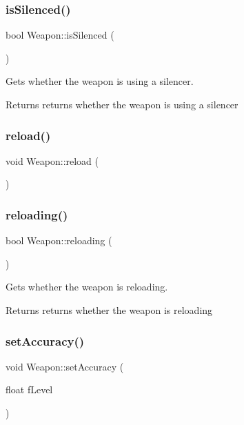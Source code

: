 \subsubsection{\texorpdfstring{is\+Silenced()}{isSilenced()}}
{\footnotesize\ttfamily bool Weapon\+::is\+Silenced (\begin{DoxyParamCaption}{ }\end{DoxyParamCaption})}



Gets whether the weapon is using a silencer. 

\begin{DoxyReturn}{Returns}
returns whether the weapon is using a silencer 
\end{DoxyReturn}
\mbox{\label{class_weapon_ae02c48b932b0327382c5dd1672079590}} 
\subsubsection{\texorpdfstring{reload()}{reload()}}
{\footnotesize\ttfamily void Weapon\+::reload (\begin{DoxyParamCaption}{ }\end{DoxyParamCaption})}

\mbox{\label{class_weapon_a5e3a65e780892db5b09601292ae59a59}} 
\subsubsection{\texorpdfstring{reloading()}{reloading()}}
{\footnotesize\ttfamily bool Weapon\+::reloading (\begin{DoxyParamCaption}{ }\end{DoxyParamCaption})}



Gets whether the weapon is reloading. 

\begin{DoxyReturn}{Returns}
returns whether the weapon is reloading 
\end{DoxyReturn}
\mbox{\label{class_weapon_ac396e6daf796e88c13bb030ed3645e4d}} 
\subsubsection{\texorpdfstring{set\+Accuracy()}{setAccuracy()}}
{\footnotesize\ttfamily void Weapon\+::set\+Accuracy (\begin{DoxyParamCaption}\item[{float}]{f\+Level }\end{DoxyParamCaption})}



